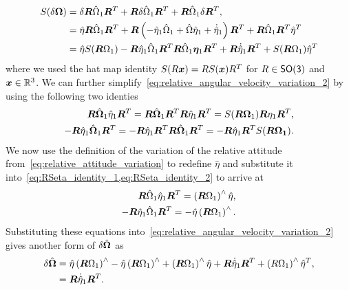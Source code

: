 \begin{align}\label{eq:relative_angular_velocity_variation_2}
    S(\delta \bm{\Omega}) &= \delta \bm{R} \hat{\Omega}_1 \bm{R}^T + \bm{R} \hat{\delta \Omega_1} \bm{R}^T + \bm{R} \hat{\Omega}_1 \delta \bm{R}^T , \\
                          &= \hat{\eta} \bm{R} \hat{\Omega}_1 \bm{R}^T + \bm{R} \left( -\hat{\eta}_1 \hat{\Omega}_1 + \hat{\Omega} \hat{\eta}_1 + \dot{\hat{\eta}}_1 \right) \bm{R}^T + \bm{R} \hat{\Omega}_1 \bm{R}^T \hat{\eta}^T \\
                          &= \hat{\eta} S(\bm{R} \Omega_1) - \bm{R} \hat{\eta}_1 \hat{\Omega}_1 \bm{R}^T \bm{R} \hat{\Omega}_1 \bm{\eta}_1 \bm{R}^T + \bm{R} \dot{\hat{\eta}}_1 \bm{R}^T + S(\bm{R}\Omega_1) \hat{\eta}^T
\end{align}
where we used the hat map identity \( S(R \bm{x}) = R S(\bm{x}) R^T\) for \( R \in \mathsf{SO(3)}\) and \( \bm{x} \in \mathbb{R}^3\).
We can further simplify~\cref{eq:relative_angular_velocity_variation_2} by using the following two identies
\begin{align}
    \bm{R} \hat{\bm{\Omega}}_1 \hat{\eta}_1 \bm{R}^T = \bm{R}\hat{\bm{\Omega}}_1 \bm{R}^T \bm{R} \hat{\eta}_1 \bm{R}^T = S(\bm{R} \bm{\Omega}_1) \bm{R} \eta_1 \bm{R}^T , \label{eq:RSeta_identity_1}\\
    -\bm{R} \hat{\eta}_1 \hat{\bm{\Omega}}_1\bm{R}^T = - \bm{R} \hat{\eta}_1 \bm{R}^T \bm{R} \hat{\bm{\Omega}}_1\bm{R}^T = -\bm{R} \hat{\eta}_1 \bm{R}^T S(\bm{R} \bm{\Omega_1}) . \label{eq:RSeta_identity_2}
\end{align}
We now use the definition of the variation of the relative attitude from~\cref{eq:relative_attitude_variation} to redefine \( \hat{\eta}\) and substitute it into~\cref{eq:RSeta_identity_1,eq:RSeta_identity_2} to arrive at
\begin{align*}
    \bm{R} \hat{\Omega}_1 \hat{\eta}_1 \bm{R}^T = \left( \bm{R} \Omega_1 \right)^\wedge \hat{\eta} , \\
    - \bm{R} \hat{\eta}_1 \hat{\Omega}_1 \bm{R}^T = -\hat{\eta} \left( \bm{R}\Omega_1 \right)^\wedge.
\end{align*}
Substituting these equations into~\cref{eq:relative_angular_velocity_variation_2} gives another form of \( \delta \hat{\bm{\Omega}}\) as
\begin{align}\label{eq:relative_angular_velocity_variation_3}
    \delta \hat{\bm{\Omega}} &= \hat{\eta} \left( \bm{R} \Omega_1 \right)^\wedge - \hat{\eta} \left( \bm{R} \Omega_1 \right)^\wedge + \left( \bm{R} \Omega_1 \right)^\wedge \hat{\eta} + \bm{R} \dot{\hat{\eta}}_1 \bm{R}^T + \left( R \Omega_1 \right)^\wedge \hat{\eta}^T , \\
                             &= \bm{R} \dot{\hat{\eta}}_1 \bm{R}^T .
\end{align}

